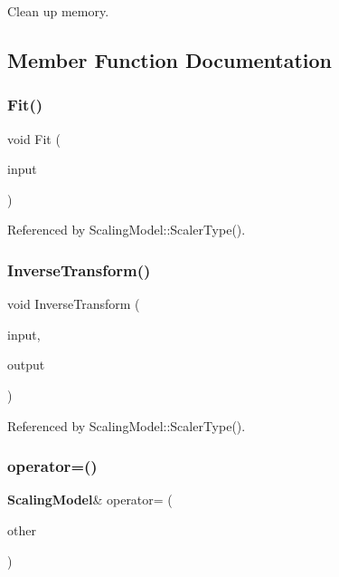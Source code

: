 Clean up memory. 



\subsection{Member Function Documentation}
\mbox{\label{classmlpack_1_1data_1_1ScalingModel_a0b68c1a39a21e56e10f5b9250b056244}} 
\subsubsection{Fit()}
{\footnotesize\ttfamily void Fit (\begin{DoxyParamCaption}\item[{const Mat\+Type \&}]{input }\end{DoxyParamCaption})}



Referenced by Scaling\+Model\+::\+Scaler\+Type().

\mbox{\label{classmlpack_1_1data_1_1ScalingModel_afb0e67c6fbf5a527f63469bbbf07066c}} 
\subsubsection{Inverse\+Transform()}
{\footnotesize\ttfamily void Inverse\+Transform (\begin{DoxyParamCaption}\item[{const Mat\+Type \&}]{input,  }\item[{Mat\+Type \&}]{output }\end{DoxyParamCaption})}



Referenced by Scaling\+Model\+::\+Scaler\+Type().

\mbox{\label{classmlpack_1_1data_1_1ScalingModel_a11764f089157e2faaa25cba55edca715}} 
\subsubsection{operator=()\hspace{0.1cm}{\footnotesize\ttfamily [1/2]}}
{\footnotesize\ttfamily \textbf{ Scaling\+Model}\& operator= (\begin{DoxyParamCaption}\item[{const \textbf{ Scaling\+Model} \&}]{other }\end{DoxyParamCaption})}



